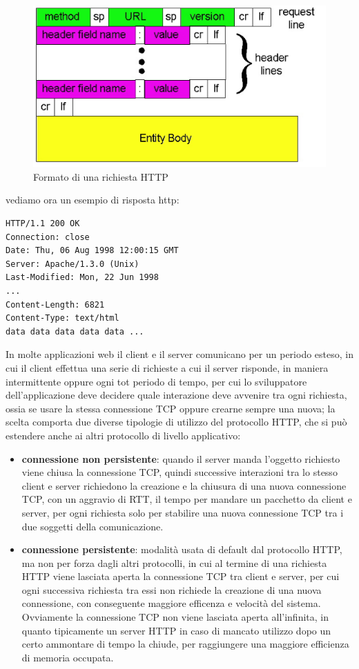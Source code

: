 \message{ !name(sd.tex)}\documentclass[a4paper,12pt, oneside]{book}
\begin{document}
\begin{figure}
    \caption{Formato di una richiesta HTTP}
    \label{fig:httpStructure}
	\includegraphics[scale=0.7]{img/http2.png}
\end{figure}
vediamo ora un esempio di risposta http:
\begin{verbatim}
HTTP/1.1 200 OK
Connection: close
Date: Thu, 06 Aug 1998 12:00:15 GMT
Server: Apache/1.3.0 (Unix)
Last-Modified: Mon, 22 Jun 1998
...
Content-Length: 6821
Content-Type: text/html
data data data data data ...
\end{verbatim}
In molte applicazioni web il client e il server comunicano per un periodo esteso, in cui il client
effettua una serie di richieste a cui il server risponde, in maniera intermittente oppure ogni tot 
periodo di tempo, per cui lo sviluppatore dell'applicazione deve decidere quale interazione deve
avvenire tra ogni richiesta, ossia se usare la stessa connessione TCP oppure crearne sempre una nuova;
la scelta comporta due diverse tipologie di utilizzo del protocollo HTTP, che si può estendere anche ai 
altri protocollo di livello applicativo:
\begin{itemize}
    \item \textbf{connessione non persistente}: quando il server manda l'oggetto richiesto viene 
        chiusa la connessione TCP, quindi successive interazioni tra lo stesso client e server richiedono
        la creazione e la chiusura di una nuova connessione TCP, con un aggravio di RTT, il tempo
        per mandare un pacchetto da client e server, per ogni richiesta solo per stabilire una nuova
        connessione TCP tra i due soggetti della comunicazione.

    \item \textbf{connessione persistente}: modalità usata di default dal protocollo HTTP, ma non per forza
        dagli altri protocolli, in cui al termine di una richiesta HTTP viene lasciata aperta la connessione
        TCP tra client e server, per cui ogni successiva richiesta tra essi non richiede la creazione
        di una nuova connessione, con conseguente maggiore efficenza e velocità del sistema.\newline
        Ovviamente la connessione TCP non viene lasciata aperta all'infinita, in quanto tipicamente 
        un server HTTP in caso di mancato utilizzo dopo un certo ammontare di tempo la chiude, per 
        raggiungere una maggiore efficienza di memoria occupata.
\end{itemize}
\end{document}
